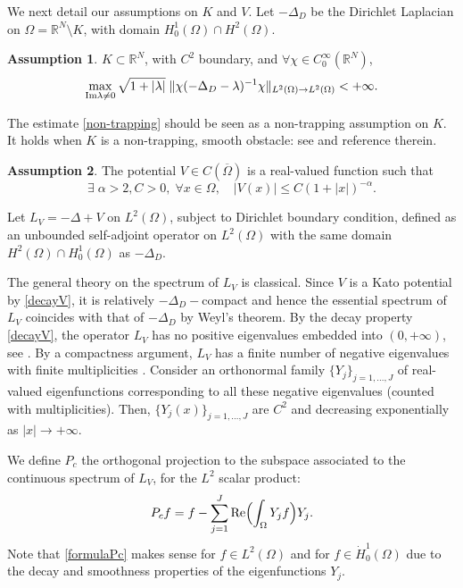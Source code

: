 \documentclass[10pt,leqno]{amsart}
\theoremstyle{definition}%
\newtheorem{assumption}{Assumption}
\theoremstyle{remark}
\numberwithin{equation}{section}
\newcommand{\R}{\mathbb{R}}
\renewcommand{\^}{\widehat}%
\begin{document}
We next detail our assumptions on $K$ and $V$. Let $-\Delta_D$ be the Dirichlet Laplacian on $\Omega=\R^N\setminus K$, with domain $H_0^1(\Omega)\cap H^2(\Omega)$.
\begin{assumption}
\label{As:K}
$K\subset \R^N$, with $C^2$ boundary, and $\forall \chi\in C_0^\infty(\mathbb{R}^N)$, 
\begin{equation}
\label{non-trapping}
\max_{{\rm Im}\lambda\neq 0}
\sqrt{1+|\lambda|}\;\| \chi (-\Delta_D-\lambda)^{-1}\chi\|_{L^2(\Omega)\to L^2(\Omega)}<+\infty.
\end{equation}
 \end{assumption}
The estimate \eqref{non-trapping} should be seen as a non-trapping assumption on $K$. 
It holds when $K$ is a non-trapping, smooth obstacle: see \cite[Remark 2.6]{Burq03} 
and reference therein.
\begin{assumption}
\label{As:V}
The potential $V\in C(\overline{\Omega})$ is a real-valued function such that 
\begin{equation}
\label{decayV}
\exists\; \alpha>2, C>0,\;\forall x\in \Omega,\quad |V(x)|\le C(1+|x|)^{-\alpha}.
\end{equation}  
\end{assumption}

Let $L_V=-\Delta+V$ on $L^2(\Omega)$, subject to Dirichlet boundary condition, defined as an unbounded self-adjoint operator on $L^2(\Omega)$ with the same domain $H^2(\Omega)\cap H^1_0(\Omega)$ as $-\Delta_D$.

The general theory on the spectrum   of $L_V$ is classical.
Since $V$ is a Kato potential by \eqref{decayV}, it is relatively $-\Delta_D-$compact and hence the essential spectrum of $L_V$ coincides with that of $-\Delta_D $ by Weyl's theorem. By the decay property \eqref{decayV}, the operator $L_V$ has no  positive eigenvalues embedded into $(0,+\infty)$, see \cite{IoJe03}. 
By a compactness argument,  $L_V$ has a finite number of negative eigenvalues with finite multiplicities \cite{DuKeMe16a}. Consider an orthonormal family $\{Y_j\}_{j=1,\ldots, J}$ of real-valued eigenfunctions corresponding to all these negative eigenvalues (counted with multiplicities). Then,  $\{Y_j(x)\}_{j=1,\ldots,J}$ are $C^2$ and decreasing exponentially as $|x|\to+\infty$.

We define $P_c$ the orthogonal projection to the subspace associated to the continuous spectrum of $L_V$, for the $L^2$ scalar product: 
\begin{equation}
\label{formulaPc}
P_cf=f-\sum_{j=1}^{J}{\rm Re}\Bigl(\int_{\Omega}Y_j f\Bigr)Y_j.
\end{equation}
Note that \eqref{formulaPc} makes sense for $f\in L^{2}(\Omega)$ and for $f\in \dot{H}^1_0(\Omega)$ due to the decay and smoothness properties of the eigenfunctions $Y_j$.
\end{document}
